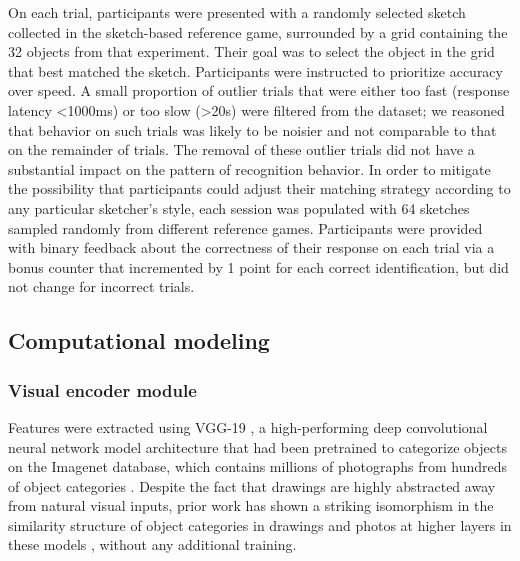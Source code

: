 \documentclass[9pt,twocolumn,twoside]{pnas-new}
\begin{document}
{On each trial, participants were presented with a randomly selected sketch collected in the sketch-based reference game, surrounded by a grid containing the 32 objects from that experiment. Their goal was to select the object in the grid that best matched the sketch. Participants were instructed to prioritize accuracy over speed. A small proportion of outlier trials that were either too fast (response latency <1000ms) or too slow (>20s) were filtered from the dataset; we reasoned that behavior on such trials was likely to be noisier and not comparable to that on the remainder of trials. The removal of these outlier trials did not have a substantial impact on the pattern of recognition behavior. In order to mitigate the possibility that participants could adjust their matching strategy according to any particular sketcher's style, each session was populated with 64 sketches sampled randomly from different reference games. Participants were provided with binary feedback about the correctness of their response on each trial via a bonus counter that incremented by 1 point for each correct identification, but did not change for incorrect trials.


\subsection*{Computational modeling}


\subsubsection*{Visual encoder module}

Features were extracted using VGG-19 \cite{simonyan2014very}, a high-performing deep convolutional neural network model architecture that had been pretrained to categorize objects on the Imagenet database, which contains millions of photographs from hundreds of object categories \cite{deng2009imagenet}. Despite the fact that drawings are highly abstracted away from natural visual inputs, prior work has shown a striking isomorphism in the similarity structure \cite{kriegeskorte2008matching} of object categories in drawings and photos at higher layers in these models \cite{fan2015common}, without any additional training.

}
\end{document}
